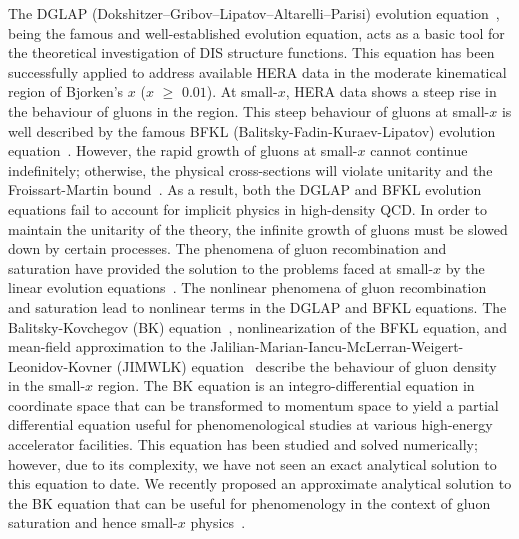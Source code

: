 \documentclass[12pt]{article}
\begin{document}
The DGLAP (Dokshitzer–Gribov–Lipatov–Altarelli–Parisi) evolution equation~\cite{a,b,c,d,e}, being the famous and well-established evolution equation, acts as a basic tool for the theoretical investigation of DIS structure functions. This equation has been successfully applied to address available HERA data in the moderate kinematical region of Bjorken's $x$ ($x$ $\geq$ $0.01$). At small-$x$, HERA data shows a steep rise in the behaviour of gluons in the region. This steep behaviour of gluons at small-$x$ is well described by the famous BFKL (Balitsky-Fadin-Kuraev-Lipatov) evolution equation~\cite{f,g}. However, the rapid growth of gluons at small-$x$ cannot continue indefinitely; otherwise, the physical cross-sections will violate unitarity and the Froissart-Martin bound~\cite{h}. As a result, both the DGLAP and BFKL evolution equations fail to account for implicit physics in high-density QCD. In order to maintain the unitarity of the theory, the infinite growth of gluons must be slowed down by certain processes. The phenomena of gluon recombination and saturation have provided the solution to the problems faced at small-$x$ by the linear evolution equations~\cite{i,j,k,l,m}. The nonlinear phenomena of gluon recombination and saturation lead to nonlinear terms in the DGLAP and BFKL equations. The Balitsky-Kovchegov (BK) equation~\cite{n,o,p,q}, nonlinearization of the BFKL equation, and mean-field approximation to the Jalilian-Marian-Iancu-McLerran-Weigert-Leonidov-Kovner (JIMWLK) equation~\cite{r,s,t,u} describe the behaviour of gluon density in the small-$x$ region. The BK equation is an integro-differential equation in coordinate space that can be transformed to momentum space to yield a partial differential equation useful for phenomenological studies at various high-energy accelerator facilities. This equation has been studied and solved numerically; however, due to its complexity, we have not seen an exact analytical solution to this equation to date. We recently proposed an approximate analytical solution to the BK equation that can be useful for phenomenology in the context of gluon saturation and hence small-$x$ physics~\cite{v}.
\end{document}
